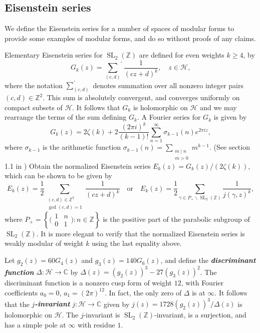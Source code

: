 \documentclass[10pt,leqno,twoside]{article}
\theoremstyle{plain}
\theoremstyle{definition}
\numberwithin{equation}{section}
\numberwithin{lem}{section}
\newcommand{\cbr}[1]{\left\{#1\right\}}
\newcommand{\textib}[1]{\textbf{\textit{#1\index{#1}}}} %
\DeclareMathOperator{\SL}{SL}
\newcommand{\slz}{\SL_2(\mathbb{Z})}
\begin{document}
\subsection{Eisenstein series}\label{section eisenstein series}
We define the Eisenstein series for a number of spaces of modular forms to provide some examples of modular forms, and do so without proofs of any claims.

Elementary Eisenstein series for $\slz$ are defined for even weights $k\geq 4$, by \[G_k(z) = {\sum_{(c,d)}}^\prime \frac{1}{(cz+d)^k},\quad z\in\mathcal H,\] where the notation $\sum_{(c,d)}^\prime$ denotes summation over all nonzero integer pairs $(c,d)\in\mathbb Z^2$. This sum is absolutely convergent, and converges uniformly on compact subsets of $\mathcal H$. It follows that $G_k$ is holomorphic on $\mathcal H$ and we may rearrange the terms of the sum defining $G_k$. A Fourier series for $G_k$ is given by \[G_k(z) = 2\zeta(k) + 2\frac{(2\pi i)^k}{(k-1)!}\sum_{n=1}^\infty \sigma_{k-1}(n)e^{2\pi i z},\] where $\sigma_{k-1}$ is the arithmetic function $\sigma_{k-1}(n) = \sum_{\substack{m\mid n\\ m>0}}m^{k-1}$. (See section 1.1 in \cite{diamond}) Obtain the normalized Eisenstein series $E_k(z) = G_k(z)/(2\zeta(k))$, which can be shown to be given by 
\[E_k(z) = \frac{1}{2}\sum_{\substack{(c,d)\in\mathbb Z^2\\\gcd(c,d) = 1}}\frac{1}{(cz+d)^k}\quad \text{or} \quad E_k(z) = \frac{1}{2}\sum_{\gamma\in P_+\backslash \slz}\frac{1}{j(\gamma,z)^k},\] where $P_+ = \cbr{\big(\!\begin{smallmatrix}
    1 & n \\ 0 & 1
\end{smallmatrix}\!\big) : n\in\mathbb Z}$ is the positive part of the parabolic subgroup of $\slz$. It is more elegant to verify that the normalized Eisenstein series is weakly modular of weight $k$ using the last equality above. 

Let $g_2(z) = 60 G_4(z)$ and $g_3(z) = 140G_6(z)$, and define the \textib{discriminant function} $\varDelta\colon\mathcal H\to\mathbb C$ by $\varDelta(z) = (g_2(z))^3-27(g_3(z))^2$. The discriminant function is a nonzero cusp form of weight $12$, with Fourier coefficients $a_0 = 0$, $a_1 = (2\pi)^{12}$. In fact, the only zero of $\varDelta$ is at $\infty$. It follows that the \textib{$j$-invariant} $j\colon \mathcal H\to\mathbb C$ given by $j(z) = 1728(g_2(z))^3/\varDelta(z)$ is holomorphic on $\mathcal H$. The $j$-invariant is $\slz$-invariant, is a surjection, and has a simple pole at $\infty$ with residue $1$.
\end{document}

